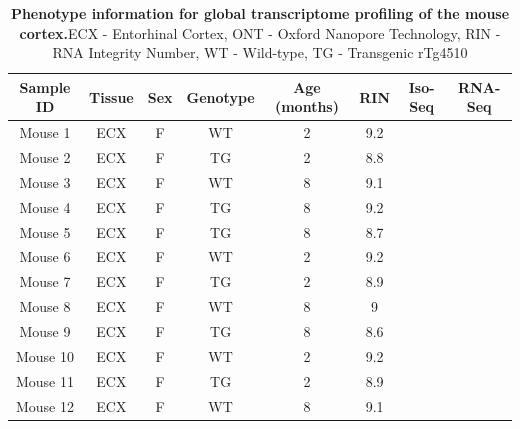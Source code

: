 \vspace{1cm}
\begin{table}[h]
	\captionsetup{width=0.95\textwidth}
	\caption[Phenotype information for global transcriptome profiling of the mouse cortex]%
	{\textbf{Phenotype information for global transcriptome profiling of the mouse cortex.}\newline ECX - Entorhinal Cortex, ONT - Oxford Nanopore Technology, RIN - RNA Integrity Number, WT - Wild-type, TG - Transgenic rTg4510}
	\label{tab:whole_phenotype}
	\centering
	\begin{tabular}{@{}cccccccc@{}}
		\toprule
		Sample ID & Tissue & Sex & Genotype & Age (months) & RIN & Iso-Seq & RNA-Seq  \\ \midrule
		Mouse 1   & ECX    & F   & WT       & 2         & 9.2 & \checkmark       &  \checkmark         \\
		Mouse 2   & ECX    & F   & TG       & 2         & 8.8 & \checkmark        & \checkmark        \\
		Mouse 3   & ECX    & F   & WT       & 8         & 9.1 & \checkmark        & \checkmark        \\
		Mouse 4   & ECX    & F   & TG       & 8         & 9.2 & \checkmark        & \checkmark        \\
		Mouse 5   & ECX    & F   & TG       & 8         & 8.7 & \checkmark        & \checkmark        \\
		Mouse 6   & ECX    & F   & WT       & 2         & 9.2 & \checkmark        & \checkmark        \\
		Mouse 7   & ECX    & F   & TG       & 2         & 8.9 & \checkmark        & \checkmark        \\
		Mouse 8   & ECX    & F   & WT       & 8         & 9   & \checkmark        & \checkmark       \\
		Mouse 9   & ECX    & F   & TG       & 8         & 8.6 & \checkmark        & \checkmark        \\
		Mouse 10  & ECX    & F   & WT       & 2         & 9.2 & \checkmark        & \checkmark        \\
		Mouse 11  & ECX    & F   & TG       & 2         & 8.9 & \checkmark        & \checkmark       \\
		Mouse 12  & ECX    & F   & WT       & 8         & 9.1 & \checkmark        & \checkmark        \\ \bottomrule
	\end{tabular}
\end{table}

